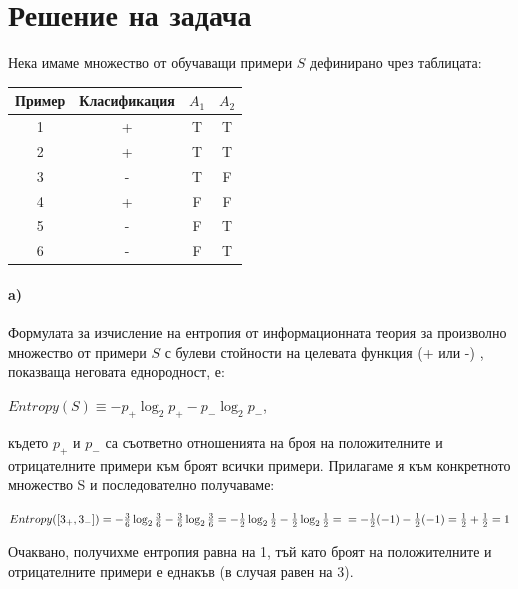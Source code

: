 \documentclass[12pt]{article}
\begin{document}
	
	
	\tableofcontents
	
	
	
	\newpage
	
	\section{Решение на задача }
	
	
	Нека имаме множество от обучаващи примери $S$ дефинирано чрез таблицата:
	\newline
	\begin{table}[h!]
	\centering
		\begin{tabular}{|c|c|c|c|}
			\hline
			Пример & Класификация & $A_{1}$ & $A_{2}$ \\ \hline				1      & +            & T       & T       \\ \hline
			2      & +            & T       & T       \\ \hline
			3      & -            & T       & F       \\ \hline
			4      & +            & F       & F       \\ \hline
			5      & -            & F       & T       \\ \hline
			6      & -            & F       & T       \\ \hline
		\end{tabular}
	\end{table}
	\newline
	
	\paragraph{a)}
	Формулата за изчисление на ентропия от информационната теория за произволно множество от примери $S$ с булеви стойности на целевата функция (+ или -) , показваща неговата еднородност, е:
	
	\begin{center}
		$Entropy(S) \equiv -p_{+}\log_2 p_{+} - p_{-}\log_2 p_{-}$,
	\end{center}
	където $p_{+}$ и $p_{-}$ са съответно отношенията на броя на положителните и отрицателните примери към броят всички примери.\newline\newline
	Прилагаме я към конкретното множество S и последователно получаваме:
	
	\begin{center}
	$Entropy([3_{+}, 3_{-}]) = -\frac{3}{6}\log_2 \frac{3}{6} - \frac{3}{6}\log_2 \frac{3}{6} = -\frac{1}{2}\log_2 \frac{1}{2} - \frac{1}{2}\log_2 \frac{1}{2} =\newline\newline= -\frac{1}{2}(-1) - \frac{1}{2}(-1) = \frac{1}{2} + \frac{1}{2} = 1$
	\end{center}
	Очаквано, получихме ентропия равна на 1, тъй като броят на положителните и отрицателните примери е еднакъв (в случая равен на 3).\newline
	\newpage
\end{document}
